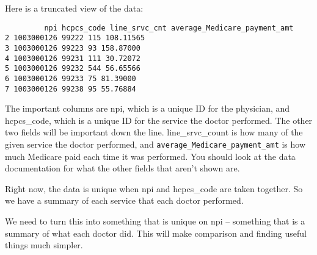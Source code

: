 Here is a truncated view of the data:
\begin{framed}
\begin{verbatim}
         npi hcpcs_code line_srvc_cnt average_Medicare_payment_amt
2 1003000126 99222 115 108.11565
3 1003000126 99223 93 158.87000
4 1003000126 99231 111 30.72072
5 1003000126 99232 544 56.65566
6 1003000126 99233 75 81.39000
7 1003000126 99238 95 55.76884
\end{verbatim}
\end{framed}
The important columns are npi, which is a unique ID for the physician, and hcpcs\_code, which is a unique ID for the service the doctor performed. The other two fields will be important down the line. line\_srvc\_count is how many of the given service the doctor performed, and \texttt{average\_Medicare\_payment\_amt} is how much Medicare paid each time it was performed. You should look at the data documentation for what the other fields that aren't shown are.

Right now, the data is unique when npi and hcpcs\_code are taken together. So we have a summary of each service that each doctor performed.

We need to turn this into something that is unique on npi -- something that is a summary of what each doctor did. This will make comparison and finding useful things much simpler.
